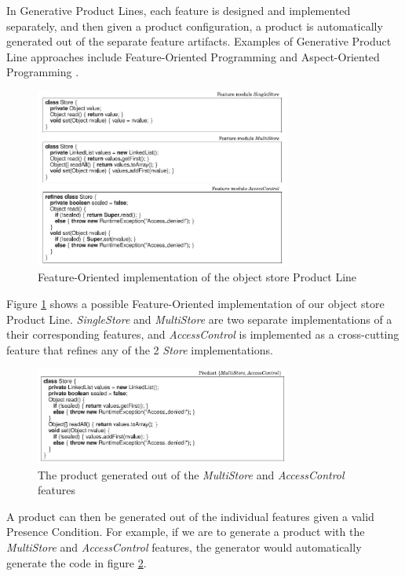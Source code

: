 \documentclass[11pt]{article}
\begin{document}
In Generative Product Lines, each feature is designed and implemented separately, and then given a product configuration, a product is automatically generated out of the separate feature artifacts. Examples of Generative Product Line approaches include Feature-Oriented Programming \cite{Prehofer1997} and Aspect-Oriented Programming \cite{Kiczales1997}.

\begin{figure}
  \centering
    \includegraphics[width=0.75\textwidth]{FeatureOriented}
  \caption{Feature-Oriented implementation of the object store Product Line}
  \label{fig:FeatureOriented}
\end{figure}

Figure \ref{fig:FeatureOriented} shows a possible Feature-Oriented implementation of our object store Product Line. \emph{SingleStore} and \emph{MultiStore} are two separate implementations of a their corresponding features, and \emph{AccessControl} is implemented as a cross-cutting feature that refines any of the 2 \emph{Store} implementations. 

\begin{figure}
  \centering
    \includegraphics[width=0.75\textwidth]{FeatureOrientedGenerated}
  \caption{The product generated out of the \emph{MultiStore} and \emph{AccessControl} features}
  \label{fig:FeatureOrientedGenerated}
\end{figure}

A product can then be generated out of the individual features given a valid Presence Condition. For example, if we are to generate a product with the \emph{MultiStore} and \emph{AccessControl} features, the generator would automatically generate the code in figure \ref{fig:FeatureOrientedGenerated}.
\end{document}

